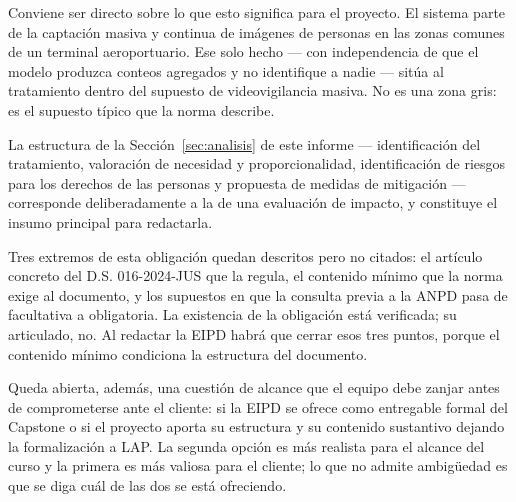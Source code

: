 Conviene ser directo sobre lo que esto significa para el proyecto. El
sistema parte de la captación masiva y continua de imágenes de personas
en las zonas comunes de un terminal aeroportuario. Ese solo hecho ---
con independencia de que el modelo produzca conteos agregados y no
identifique a nadie --- sitúa al tratamiento dentro del supuesto de
videovigilancia masiva. No es una zona gris: es el supuesto típico que
la norma describe.


La estructura de la Sección~\ref{sec:analisis} de este informe ---
identificación del tratamiento, valoración de necesidad y
proporcionalidad, identificación de riesgos para los derechos de las
personas y propuesta de medidas de mitigación --- corresponde
deliberadamente a la de una evaluación de impacto, y constituye el
insumo principal para redactarla.

Tres extremos de esta obligación quedan descritos pero no citados: el
artículo concreto del D.S. 016-2024-JUS que la regula, el contenido
mínimo que la norma exige al documento, y los supuestos en que la
consulta previa a la ANPD pasa de facultativa a obligatoria. La
existencia de la obligación está verificada; su articulado, no. Al
redactar la EIPD habrá que cerrar esos tres puntos, porque el contenido
mínimo condiciona la estructura del documento.

Queda abierta, además, una cuestión de alcance que el equipo debe zanjar
antes de comprometerse ante el cliente: si la EIPD se ofrece como
entregable formal del Capstone o si el proyecto aporta su estructura y su
contenido sustantivo dejando la formalización a LAP. La segunda opción es
más realista para el alcance del curso y la primera es más valiosa para
el cliente; lo que no admite ambigüedad es que se diga cuál de las dos se
está ofreciendo.

